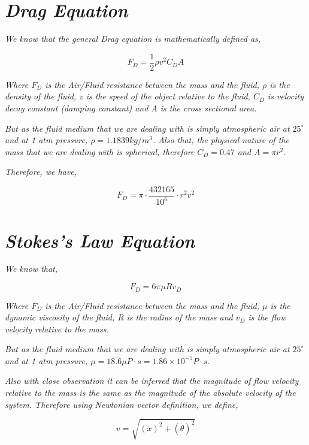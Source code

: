 \section{\textit{Drag Equation}}
            
    \textit{We know that the general Drag equation is mathematically defined as,}
            
        $$F_D = \frac{1}{2}\rho v^2C_DA$$
           
    \textit{Where $F_D$ is the Air/Fluid resistance between the mass and the fluid, $\rho$ is the density of the fluid, v is the speed of the object relative to the fluid, $C_D$ is velocity decay constant (damping constant) and A is the cross sectional area.}
            
    \textit{But as the fluid medium that we are dealing with is simply atmospheric air at $25^\circ$ and at 1 atm pressure, $\rho = 1.1839 kg/m^3$. Also that, the physical nature of the mass that we are dealing with is spherical, therefore $C_D = 0.47$ and $A = \pi r^2$.}
            
    \textit{Therefore, we have,}
            
        $$F_D = \pi\cdot\frac{432165}{10^{6}}\cdot r^2v^2$$
            
\section{\textit{Stokes's Law Equation}}
            
    \textit{We know that,}
            
        $$F_D = 6\pi\mu Rv_D$$
            
    \textit{Where $F_D$ is the Air/Fluid resistance between the mass and the fluid, $\mu$ is the dynamic viscosity of the fluid, R is the radius of the mass and $v_D$ is the flow velocity relative to the mass.}
            
    \textit{But as the fluid medium that we are dealing with is simply atmospheric air at $25^\circ$ and at 1 atm pressure, $\mu = 18.6 \mu P\cdot s = 1.86 \times 10^{-5} P\cdot s$.}
            
    \textit{Also with close observation it can be inferred that the magnitude of flow velocity relative to the mass is the same as the magnitude of the absolute velocity of the system. Therefore using Newtonian vector definition, we define,}
            
        $$v = \sqrt{(\ddot{x})^2 + (\ddot{\theta})^2}$$
        

